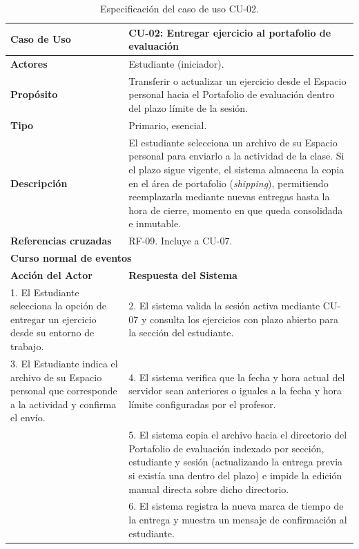 \begin{table}[H]
\centering
\caption{Especificación del caso de uso CU-02.}
\label{tab:cu_02}
\small
\begin{tabular}{p{} p{}}
\toprule
\textbf{Caso de Uso} & \textbf{CU-02: Entregar ejercicio al portafolio de evaluación} \\
\midrule
\textbf{Actores} & Estudiante (iniciador). \\
\textbf{Propósito} & Transferir o actualizar un ejercicio desde el Espacio personal hacia el Portafolio de evaluación dentro del plazo límite de la sesión. \\
\textbf{Tipo} & Primario, esencial. \\
\textbf{Descripción} & El estudiante selecciona un archivo de su Espacio personal para enviarlo a la actividad de la clase. Si el plazo sigue vigente, el sistema almacena la copia en el área de portafolio (\textit{shipping}), permitiendo reemplazarla mediante nuevas entregas hasta la hora de cierre, momento en que queda consolidada e inmutable. \\
\textbf{Referencias cruzadas} & RF-09. Incluye a CU-07. \\
\midrule
\multicolumn{2}{l}{\textbf{Curso normal de eventos}} \\
\midrule
\textbf{Acción del Actor} & \textbf{Respuesta del Sistema} \\
\midrule
1. El Estudiante selecciona la opción de entregar un ejercicio desde su entorno de trabajo. & 2. El sistema valida la sesión activa mediante CU-07 y consulta los ejercicios con plazo abierto para la sección del estudiante. \\
3. El Estudiante indica el archivo de su Espacio personal que corresponde a la actividad y confirma el envío. & 4. El sistema verifica que la fecha y hora actual del servidor sean anteriores o iguales a la fecha y hora límite configuradas por el profesor. \\
 & 5. El sistema copia el archivo hacia el directorio del Portafolio de evaluación indexado por sección, estudiante y sesión (actualizando la entrega previa si existía una dentro del plazo) e impide la edición manual directa sobre dicho directorio. \\
 & 6. El sistema registra la nueva marca de tiempo de la entrega y muestra un mensaje de confirmación al estudiante. \\
\bottomrule
\end{tabular}
\end{table}

